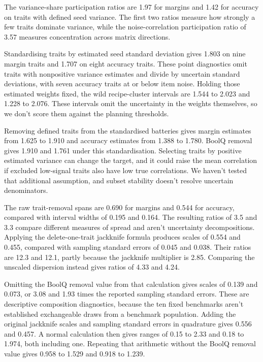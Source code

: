 The variance-share participation ratios are 1.97 for margins and 1.42 for accuracy on traits with defined seed variance. The first two ratios measure how strongly a few traits dominate variance, while the noise-correlation participation ratio of 3.57 measures concentration across matrix directions.

Standardising traits by estimated seed standard deviation gives 1.803 on nine margin traits and 1.707 on eight accuracy traits. These point diagnostics omit traits with nonpositive variance estimates and divide by uncertain standard deviations, with seven accuracy traits at or below item noise. Holding those estimated weights fixed, the wild recipe-cluster intervals are 1.544 to 2.023 and 1.228 to 2.076. These intervals omit the uncertainty in the weights themselves, so we don't score them against the planning thresholds.

Removing defined traits from the standardised batteries gives margin estimates from 1.625 to 1.910 and accuracy estimates from 1.388 to 1.780. BoolQ removal gives 1.910 and 1.761 under this standardisation. Selecting traits by positive estimated variance can change the target, and it could raise the mean correlation if excluded low-signal traits also have low true correlations. We haven't tested that additional assumption, and subset stability doesn't resolve uncertain denominators.

The raw trait-removal spans are 0.690 for margins and 0.544 for accuracy, compared with interval widths of 0.195 and 0.164. The resulting ratios of 3.5 and 3.3 compare different measures of spread and aren't uncertainty decompositions. Applying the delete-one-trait jackknife formula produces scales of 0.554 and 0.455, compared with sampling standard errors of 0.045 and 0.038. Their ratios are 12.3 and 12.1, partly because the jackknife multiplier is 2.85. Comparing the unscaled dispersion instead gives ratios of 4.33 and 4.24.

Omitting the BoolQ removal value from that calculation gives scales of 0.139 and 0.073, or 3.08 and 1.93 times the reported sampling standard errors. These are descriptive composition diagnostics, because the ten fixed benchmarks aren't established exchangeable draws from a benchmark population. Adding the original jackknife scales and sampling standard errors in quadrature gives 0.556 and 0.457. A normal calculation then gives ranges of 0.15 to 2.33 and 0.18 to 1.974, both including one. Repeating that arithmetic without the BoolQ removal value gives 0.958 to 1.529 and 0.918 to 1.239.

